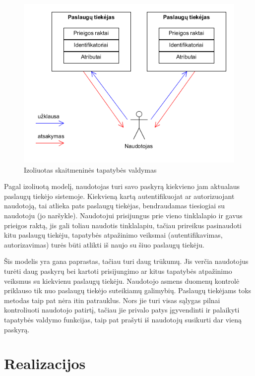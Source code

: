 \begin{figure}[H]
    \centering
    \includegraphics[scale=0.8]{img/IsolatedModel}
    \caption{Izoliuotas skaitmeninės tapatybės valdymas \cite{Cao2010}}
\end{figure}

Pagal izoliuotą modelį, naudotojas turi savo paskyrą kiekvieno jam aktualaus paslaugų tiekėjo sistemoje. Kiekvieną kartą autentifikuojat ar autorizuojant
naudotoją, tai atlieka pats paslaugų tiekėjas, bendraudamas tiesiogiai su naudotoju (jo naršykle). Naudotojui prisijungus prie vieno tinklalapio ir gavus
prieigos raktą, jis gali toliau naudotis tinklalapiu, tačiau prireikus pasinaudoti kitu paslaugų tiekėju, tapatybės atpažinimo veiksmai (autentifikavimas, autorizavimas)
turės būti atlikti iš naujo su šiuo paslaugų tiekėju.

Šis modelis yra gana paprastas, tačiau turi daug trūkumų. Jis verčia naudotojus turėti daug paskyrų bei kartoti prisijungimo
ar kitus tapatybės atpažinimo veiksmus su kiekvienu paslaugų tiekėju. Naudotojo asmens
duomenų kontrolė priklauso tik nuo paslaugų tiekėjo suteikiamų galimybių. Paslaugų tiekėjams toks metodas taip pat nėra itin patrauklus.
Nors jie turi visas sąlygas pilnai kontroliuoti naudotojo patirtį,
tačiau jie privalo patys įgyvendinti ir palaikyti tapatybės valdymo funkcijas, taip pat prašyti iš
naudotojų susikurti dar vieną paskyrą.
\\

\chapter{\textbf{Realizacijos}}

